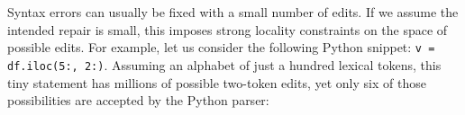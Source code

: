 Syntax errors can usually be fixed with a small number of edits. If we assume the intended repair is small, this imposes strong locality constraints on the space of possible edits. For example, let us consider the following Python snippet: \texttt{v = df.iloc(5:, 2:)}. Assuming an alphabet of just a hundred lexical tokens, this tiny statement has millions of possible two-token edits, yet only six of those possibilities are accepted by the Python parser:\vspace{-3pt}
%
%
%
%
%
%
%


